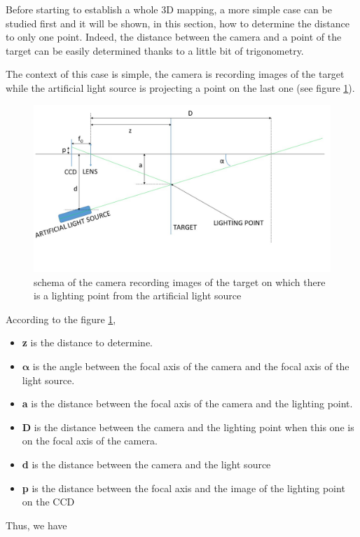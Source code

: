 Before starting to establish a whole 3D mapping, a more simple case can be studied first and it will be shown, in this section, how to determine the distance to only one point. Indeed, the distance between the camera and a point of the target can be easily determined thanks to a little bit of trigonometry.

The context of this case is simple, the camera is recording images of the target while the artificial light source is projecting a point on the last one (see figure \ref{fig:schema1D}).

\begin{figure}[h]
  \centerline{\includegraphics[scale=0.5]{fig/schema1D.jpg}}
  \caption{schema of the camera recording images of the target on which there is a lighting point from the artificial light source}
  \label{fig:schema1D}
\end{figure}

According to the figure \ref{fig:schema1D}, 
\begin{itemize}
\item \textbf{z} is the distance to determine.
\item $\bm{\alpha}$ is the angle between the focal axis of the camera and the focal axis of the light source.
\item \textbf{a} is the distance between the focal axis of the camera and the lighting point.
\item \textbf{D} is the distance between the camera and the lighting point when this one is on the focal axis of the camera.
\item \textbf{d} is the distance between the camera and the light source
\item \textbf{p} is the distance between the focal axis and the image of the lighting point on the CCD
\end{itemize}
Thus, we have

